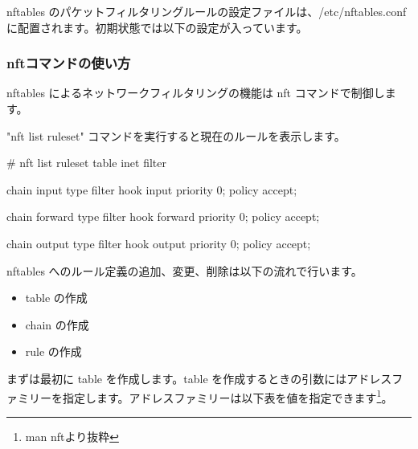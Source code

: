 \documentclass[mingoth,a4paper]{jsarticle}
\begin{document}
nftables のパケットフィルタリングルールの設定ファイルは、/etc/nftables.conf に配置されます。初期状態では以下の設定が入っています。



\subsubsection{nftコマンドの使い方}

nftables によるネットワークフィルタリングの機能は nft コマンドで制御します。

"nft list ruleset" コマンドを実行すると現在のルールを表示します。

\begin{commandline}
# nft list ruleset
table inet filter {
    chain input {
        type filter hook input priority 0; policy accept;
    }

    chain forward {
        type filter hook forward priority 0; policy accept;
    }

    chain output {
        type filter hook output priority 0; policy accept;
    }
}
\end{commandline}

nftables へのルール定義の追加、変更、削除は以下の流れで行います。

\begin{itemize}
\item table の作成
\item chain の作成
\item rule の作成
\end{itemize}



まずは最初に table を作成します。table を作成するときの引数にはアドレスファミリーを指定します。アドレスファミリーは以下表を値を指定できます\footnote{man nftより抜粋}。
\end{document}
